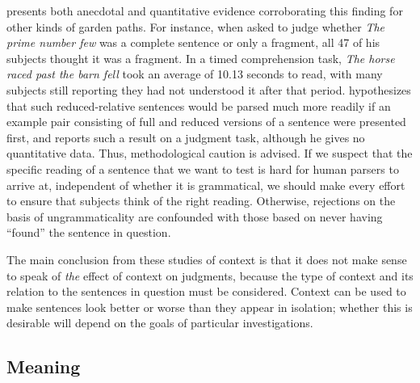 \citet{Milne1982} presents both anecdotal and quantitative evidence corroborating this finding for other kinds of garden paths. For instance, when asked to judge whether \textit{The prime number few}  was a complete sentence or only a fragment, all 47 of his subjects thought it was a fragment. In a timed comprehension task, \textit{The horse raced past the barn fell} took an average of 10.13 seconds to read, with many   subjects still reporting they had not understood  it after that period. \citet{Bever1970b}   hypothesizes that such reduced-relative  sentences would be parsed
much more readily if an example pair consisting of full and reduced versions of a sentence were presented first, and \citet{Matthews1979} reports such a result on a judgment  task,  although  he  gives  no  quantitative  data. Thus,  methodological
caution is advised. If we suspect that the specific reading of a sentence that we want to test is hard for human parsers to arrive at, independent of whether it is grammatical, we should make every effort to ensure that subjects think of the right reading. Otherwise, rejections on the basis of ungrammaticality are confounded with those based on never having ``found'' the sentence in question.

The main conclusion from these studies of context is that it does not make sense to speak of \textit{the} effect of context on judgments, because the type of context and its relation to the sentences in question must be considered. Context can be used to make sentences look better or worse than they appear in isolation; whether this is desirable will depend on the goals of particular investigations.

\subsection{Meaning}\label{sec:5.3.2} 


